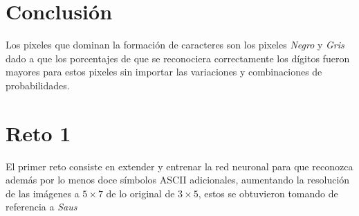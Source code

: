\documentclass{article}
\begin{document}
\begin{figure}[h!]
\centering
{}
\caption{ }\label{fig1}
\end{figure}






\newpage
\section{Conclusión}
Los pixeles que dominan la formación de caracteres son los pixeles \textit{Negro} y \textit{Gris} dado a que los porcentajes de que se reconociera correctamente los dígitos fueron mayores para estos pixeles sin importar las variaciones y combinaciones de probabilidades.

\section*{Reto 1}
El primer reto consiste en extender y entrenar la red neuronal para que reconozca además por lo menos doce símbolos ASCII adicionales, aumentando la resolución de las imágenes a $5\times 7$ de lo original de $3\times 5$, estos se obtuvieron tomando de referencia a \textit{Saus} \cite{saus}
\end{document}

